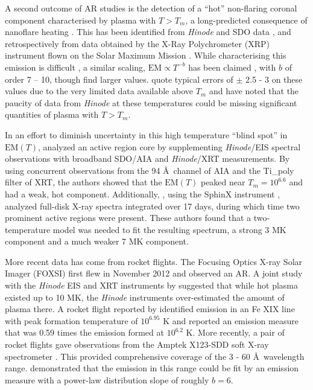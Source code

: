 \documentclass[apj]{emulateapj}
\newcommand{\ang}{\AA~}
\begin{document}
%
	\par A second outcome of AR studies is the detection of a ``hot'' non-flaring coronal component characterised by plasma with $T > T_m$, a long-predicted consequence of nanoflare heating \citep{cargill_implications_1994,cargill_diagnostics_1995}. This has been identified from \textit{Hinode} and SDO data \citep{reale_evidence_2009,schmelz_hinode_2009,testa_hinode/eis_2012}, and retrospectively from data obtained by the X-Ray Polychrometer (XRP) instrument flown on the Solar Maximum Mission \citep{del_zanna_elemental_2014}. While characterising this emission is difficult \citep[e.g.][]{testa_temperature_2011,winebarger_defining_2012}, a similar scaling, $\mathrm{EM} \propto T^{-b}$ has been claimed \citep[e.g.][]{warren_systematic_2012}, with $b$ of order 7 – 10, though \citeauthor{del_zanna_elemental_2014} find larger values. \citeauthor{warren_systematic_2012} quote typical errors of $\pm$ 2.5 - 3 on these values due to the very limited data available above $T_m$ and \citeauthor{winebarger_defining_2012} have noted that the paucity of data from \textit{Hinode} at these temperatures could be missing significant quantities of plasma with $T > T_m$.
	\par In an effort to diminish uncertainty in this high temperature ``blind spot'' in $\mathrm{EM}(T)$, \citet{petralia_thermal_2014} analyzed an active region core by supplementing \textit{Hinode}/EIS spectral observations with broadband SDO/AIA and \textit{Hinode}/XRT measurements. By using concurrent observations from the 94 \ang channel of AIA and the Ti\_poly filter of XRT, the authors showed that the $\mathrm{EM}(T)$ peaked near $T_m = 10^{6.6}$ and had a weak, hot component. Additionally, \citet{miceli_x-ray_2012}, using the SphinX instrument \citep{sylwester_sphinx:_2008,gburek_sphinx_2011}, analyzed full-disk X-ray spectra integrated over 17 days, during which time two prominent active regions were present. These authors found that a two-temperature model was needed to fit the resulting spectrum, a strong 3 MK component and a much weaker 7 MK component.
%
	\par More recent data has come from rocket flights. The Focusing Optics X-ray Solar Imager (FOXSI) \citep{krucker_focusing_2011} first flew in November 2012 and observed an AR. A joint study with the \textit{Hinode} EIS and XRT instruments by \citet{ishikawa_constraining_2014} suggested that while hot plasma existed up to 10 MK, the \textit{Hinode} instruments over-estimated the amount of plasma there. A rocket flight reported by \citet{brosius_pervasive_2014} identified emission in an Fe XIX line with peak formation temperature of $10^{6.95}$ K and reported an emission measure that was 0.59 times the emission formed at $10^{6.2}$ K. More recently, a pair of rocket flights gave observations from the Amptek X123-SDD soft X-ray spectrometer \citep{caspi_new_2015}. This provided comprehensive coverage of the 3 - 60 \ang wavelength range. \citeauthor{caspi_new_2015} demonstrated that the emission in this range could be fit by an emission measure with a power-law distribution slope of roughly $b = 6$. 
\end{document}
